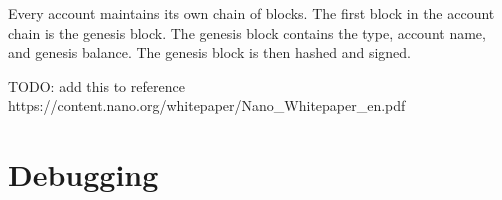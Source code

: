 \documentclass{report}
\begin{document}
Every account maintains its own chain of blocks. The first block in the account
chain is the genesis block. The genesis block contains the type, account name,
and genesis balance. The genesis block is then hashed and signed.



TODO: add this to reference\newline
https://content.nano.org/whitepaper/Nano\_Whitepaper\_en.pdf

\chapter{Debugging}
\end{document}
